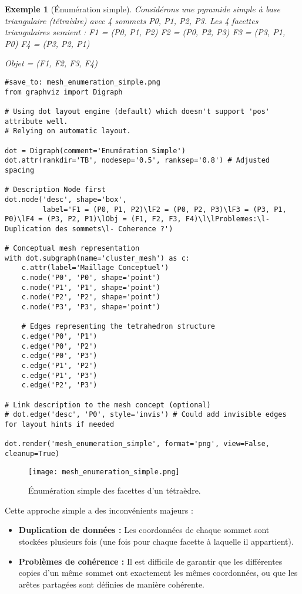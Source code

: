 \documentclass{article}
\newtheorem{example}{Exemple}
\begin{document}
\begin{example}[Énumération simple]
Considérons une pyramide simple à base triangulaire (tétraèdre) avec 4 sommets P0, P1, P2, P3.
Les 4 facettes triangulaires seraient :
F1 = (P0, P1, P2)
F2 = (P0, P2, P3)
F3 = (P3, P1, P0) %
F4 = (P3, P2, P1) %

Objet = (F1, F2, F3, F4)
\end{example}

\begin{verbatim}
#save_to: mesh_enumeration_simple.png
from graphviz import Digraph

# Using dot layout engine (default) which doesn't support 'pos' attribute well.
# Relying on automatic layout.

dot = Digraph(comment='Enumération Simple')
dot.attr(rankdir='TB', nodesep='0.5', ranksep='0.8') # Adjusted spacing

# Description Node first
dot.node('desc', shape='box',
         label='F1 = (P0, P1, P2)\lF2 = (P0, P2, P3)\lF3 = (P3, P1, P0)\lF4 = (P3, P2, P1)\lObj = (F1, F2, F3, F4)\l\lProblemes:\l- Duplication des sommets\l- Coherence ?')

# Conceptual mesh representation
with dot.subgraph(name='cluster_mesh') as c:
    c.attr(label='Maillage Conceptuel')
    c.node('P0', 'P0', shape='point')
    c.node('P1', 'P1', shape='point')
    c.node('P2', 'P2', shape='point')
    c.node('P3', 'P3', shape='point')

    # Edges representing the tetrahedron structure
    c.edge('P0', 'P1')
    c.edge('P0', 'P2')
    c.edge('P0', 'P3')
    c.edge('P1', 'P2')
    c.edge('P1', 'P3')
    c.edge('P2', 'P3')

# Link description to the mesh concept (optional)
# dot.edge('desc', 'P0', style='invis') # Could add invisible edges for layout hints if needed

dot.render('mesh_enumeration_simple', format='png', view=False, cleanup=True)
\end{verbatim}

\begin{figure}[H]
\centering
\texttt{[image: mesh\_enumeration\_simple.png]} %
\caption{Énumération simple des facettes d'un tétraèdre.}
\label{fig:mesh_enum_simple}
\end{figure}

Cette approche simple a des inconvénients majeurs :
\begin{itemize}
    \item \textbf{Duplication de données :} Les coordonnées de chaque sommet sont stockées plusieurs fois (une fois pour chaque facette à laquelle il appartient).
    \item \textbf{Problèmes de cohérence :} Il est difficile de garantir que les différentes copies d'un même sommet ont exactement les mêmes coordonnées, ou que les arêtes partagées sont définies de manière cohérente.
\end{itemize}
\end{document}
